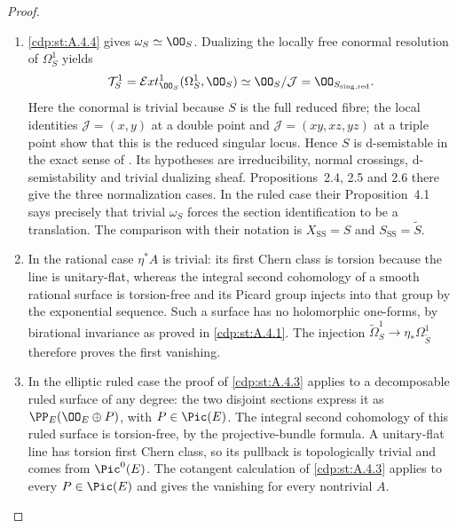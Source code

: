 \begin{proof}

\begin{enumerate}[label=\arabic*.,leftmargin=*]
\item \ref{cdp:st:A.4.4} gives $\omega_S\simeq\OO_S$. Dualizing the locally free conormal resolution of $\Omega_S^1$ yields
\[
 \mathcal T^1_S=\mathcal Ext^1_{\OO_S}(\Omega_S^1,\OO_S)
 \simeq\OO_S/\mathcal J=\OO_{S_{\rm sing,red}}.
\]
Here the conormal is trivial because $S$ is the full reduced fibre; the local identities $\mathcal J=(x,y)$ at a double point and $\mathcal J=(xy,xz,yz)$ at a triple point show that this is the reduced singular locus. Hence $S$ is d-semistable in the exact sense of \cite[Definition~2.1]{SS2002}. Its hypotheses are irreducibility, normal crossings, d-semistability and trivial dualizing sheaf. Propositions~2.4, 2.5 and 2.6 there give the three normalization cases. In the ruled case their Proposition~4.1 says precisely that trivial $\omega_S$ forces the section identification to be a translation. The comparison with their notation is $X_{\mathrm{SS}}=S$ and $S_{\mathrm{SS}}=\widetilde S$.

\item In the rational case $\eta^*A$ is trivial: its first Chern class is torsion because the line is unitary-flat, whereas the integral second cohomology of a smooth rational surface is torsion-free and its Picard group injects into that group by the exponential sequence. Such a surface has no holomorphic one-forms, by birational invariance as proved in \ref{cdp:st:A.4.1}. The injection $\widetilde\Omega_S^1\to\eta_*\Omega^1_{\widetilde S}$ therefore proves the first vanishing.

\item In the elliptic ruled case the proof of \ref{cdp:st:A.4.3} applies to a decomposable ruled surface of any degree: the two disjoint sections express it as $\PP_E(\OO_E\oplus P)$, with $P\in\Pic(E)$. The integral second cohomology of this ruled surface is torsion-free, by the projective-bundle formula. A unitary-flat line has torsion first Chern class, so its pullback is topologically trivial and comes from $\Pic^0(E)$. The cotangent calculation of \ref{cdp:st:A.4.3} applies to every $P\in\Pic(E)$ and gives the vanishing for every nontrivial $A$.


\end{enumerate}
\end{proof}
